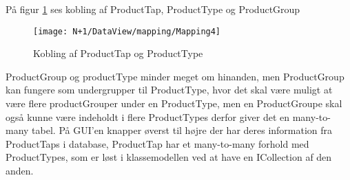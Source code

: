 På figur \ref{fig:Mapping_ProductTap_Type} ses kobling af ProductTap, ProductType og ProductGroup

\begin{figure}[H]
    \centering
    \texttt{[image: N+1/DataView/mapping/Mapping4]}
    \caption{Kobling af ProductTap og ProductType}
    \label{fig:Mapping_ProductTap_Type}
\end{figure}

ProductGroup og productType minder meget om hinanden, men ProductGroup kan fungere som undergrupper til ProductType, hvor det skal være muligt at være flere productGrouper under en ProductType, men en ProductGroupe skal også kunne være indeholdt i flere ProductTypes derfor giver det en many-to-many tabel.
\newline
\newline
På GUI'en knapper øverst til højre der har deres information fra ProductTaps i database, ProductTap har et many-to-many forhold med ProductTypes, som er løst i klassemodellen ved at have en ICollection af den anden. 
